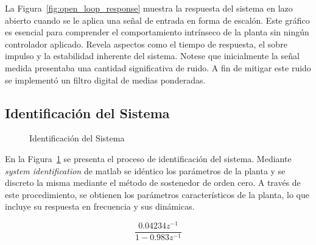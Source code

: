 \documentclass[conference,onecolumn]{IEEEtran}
\begin{document}
La Figura~\ref{fig:open_loop_response} muestra la respuesta del sistema en lazo abierto cuando se le aplica una señal de entrada en forma de escalón. Este gráfico es esencial para comprender el comportamiento intrínseco de la planta sin ningún controlador aplicado. Revela aspectos como el tiempo de respuesta, el sobre impulso y la estabilidad inherente del sistema. 
Notese que inicialmente la señal medida presentaba una cantidad significativa de ruido. A fin de mitigar este ruido se implementó un filtro digital de medias ponderadas.

\subsection{Identificación del Sistema}

\begin{figure}[H]
    \centering
    \caption{Identificación del Sistema}
    \label{fig:sistem_identification}
\end{figure}

En la Figura~\ref{fig:sistem_identification} se presenta el proceso de identificación del sistema. 
Mediante \textit{system identification} de matlab se idéntico los parámetros de la planta y se discreto la misma mediante el método de sostenedor de orden cero.
A través de este procedimiento, se obtienen los parámetros característicos de la planta, lo que incluye su respuesta en frecuencia y sus dinámicas.

\begin{equation}
\frac{0.04234 z^{-1}}{1 - 0.983 z^{-1}}
\end{equation}
\end{document}
